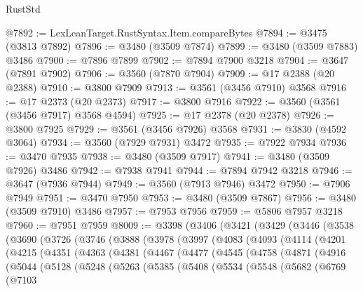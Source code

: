 \begin{lexlean}{RustStd}
\begin{coremodule}
@7892 := LexLeanTarget.RustSyntax.Item.compareBytes
@7894 := @3475 (@3813 @7892)
@7896 := @3480 (@3509 @7874)
@7899 := @3480 (@3509 @7883) @3486
@7900 := @7896 @7899
@7902 := @7894 @7900 @3218
@7904 := @3647 (@7891 @7902)
@7906 := @3560 (@7870 @7904)
@7909 := @17 @2388 (@20 @2388)
@7910 := @3800 @7909
@7913 := @3561 (@3456 @7910) @3568
@7916 := @17 @2373 (@20 @2373)
@7917 := @3800 @7916
@7922 := @3560 (@3561 (@3456 @7917) @3568 @4594)
@7925 := @17 @2378 (@20 @2378)
@7926 := @3800 @7925
@7929 := @3561 (@3456 @7926) @3568
@7931 := @3830 (@4592 @3064)
@7934 := @3560 (@7929 @7931) @3472
@7935 := @7922 @7934
@7936 := @3470 @7935
@7938 := @3480 (@3509 @7917)
@7941 := @3480 (@3509 @7926) @3486
@7942 := @7938 @7941
@7944 := @7894 @7942 @3218
@7946 := @3647 (@7936 @7944)
@7949 := @3560 (@7913 @7946) @3472
@7950 := @7906 @7949
@7951 := @3470 @7950
@7953 := @3480 (@3509 @7867)
@7956 := @3480 (@3509 @7910) @3486
@7957 := @7953 @7956
@7959 := @5806 @7957 @3218
@7960 := @7951 @7959
@8009 := @3398
    (@3406
      (@3421
        (@3429
          (@3446
            (@3538
              (@3690
                (@3726
                  (@3746
                    (@3888
                      (@3978
                        (@3997
                          (@4083
                            (@4093
                              (@4114
                                (@4201
                                  (@4215
                                    (@4351
                                      (@4363
                                        (@4381
                                          (@4467
                                            (@4477
                                              (@4545
                                                (@4758
                                                  (@4871
                                                    (@4916
                                                      (@5044
                                                        (@5128
                                                          (@5248
                                                            (@5263
                                                              (@5385
                                                                (@5408
                                                                  (@5534
                                                                    (@5548
                                                                      (@5682
                                                                        (@6769
                                                                          (@7103

\end{coremodule}
\end{lexlean}

